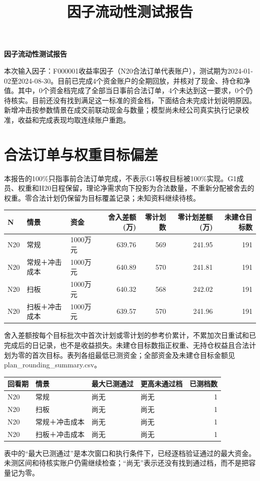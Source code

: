 \documentclass[UTF8,10pt,a4paper,fontset=fandol]{ctexart}
\title{因子流动性测试报告}\date{}\author{}
\begin{document}
{\Large\bfseries 因子流动性测试报告}\par
本次输入因子：F000001收益率因子（N20合法订单代表账户），测试期为2024-01-02至2024-08-30。目前已完成4个资金账户的全期回放，并核对了现金、持仓和净值。其中，0个资金档完成了全部当日事前合法订单，4个未达到这一要求，0个仍待核实。目前还没有找到满足这一标准的资金档，下面结合未完成计划说明原因。新增冲击按参数情景在成交前联动现金与数量；模型尚未经公司真实执行记录校准，收益和完成表现均取连续账户重跑。\section*{合法订单与权重目标偏差}本报告的100\%只指事前合法订单完成，不表示G1等权目标被100\%实现。G1成员、权重和H20日程保留，理论净需求向下投影为合法数量，不重新分配被舍去的权重。零合法计划仍保留为目标覆盖记录；未知资料继续待核。\begin{table}[H]\centering\scriptsize\begin{tabular}{lllrrrr}\toprule N & 情景 & 资金 & 舍入差额(万) & 零计划数 & 零计划差额(万) & 未建仓目标数\\\midrule N20 & 常规 & 1000万元 & 639.76 & 569 & 241.95 & 191 \\
N20 & 常规＋冲击成本 & 1000万元 & 640.89 & 570 & 241.81 & 191 \\
N20 & 扫板 & 1000万元 & 640.32 & 568 & 242.02 & 191 \\
N20 & 扫板＋冲击成本 & 1000万元 & 639.57 & 570 & 241.96 & 191 \\\bottomrule\end{tabular}\end{table}舍入差额按每个目标批次中首次计划或零计划的参考价累计，不累加次日重试和已完成后的日记录，也不是收益损失。未建仓目标数指正权重、无持仓权益且合法计划为零的首次目标。表列各组最低已测资金；全部资金及未建仓目标金额见plan\_rounding\_summary.csv。

\begin{table}[H]\centering\small
\begin{tabular}{llllr}\toprule
回看期 & 情景 & 最大已测通过 & 更高未通过档 & 已测档数\\\midrule
N20 & 常规 & 尚无 & 尚无 & 1 \\
N20 & 扫板 & 尚无 & 尚无 & 1 \\
N20 & 常规＋冲击成本 & 尚无 & 尚无 & 1 \\
N20 & 扫板＋冲击成本 & 尚无 & 尚无 & 1 \\
\bottomrule\end{tabular}
\end{table}
表中的“最大已测通过”是本次窗口和执行条件下，已经逐档验证通过的最大资金。未测区间和待核实账户仍需继续检查；“尚无”表示还没有找到通过档，而不是把容量记为零。
\end{document}
